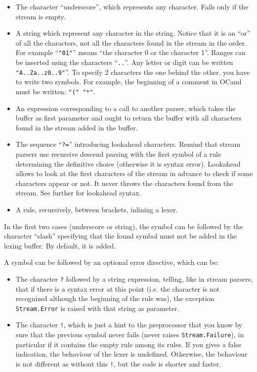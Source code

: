 \documentclass[11pt]{article}
\begin{document}
\begin{itemize}

\item The character ``underscore'', which represents any
  character. Fails only if the stream is empty.

\item A string which represent any character in the string. Notice
  that it is an ``or'' of all the characters, not all the characters
  found in the stream in the order. For example ``\verb/"01"/'' means
  ``the character 0 or the character 1''. Ranges can be inserted using
  the characters ``\verb/../''. Any letter or digit can be written
  \verb/"A..Za..z0..9"/''. To specify 2 characters the one behind the
  other, you have to write two symbols. For example, the beginning of
  a comment in OCaml must be written: \verb/"(" "*"/.

\item An expression corresponding to a call to another parser, which
  takes the buffer as first parameter and ought to return the buffer
  with all characters found in the stream added in the buffer.

\item The sequence ``\verb/?=/'' introducing lookahead characters.
  Remind that stream parsers use recursive descend parsing with the
  first symbol of a rule determining the definitive choice (otherwise
  it is syntax error). Lookahead allows to look at the first
  characters of the stream in advance to check if some characters
  appear or not. It never throws the characters found from the stream.
  See further for lookahead syntax.

\item A rule, recursively, between brackets, inlining a lexer.

\end{itemize}

In the first two cases (underscore or string), the symbol can be
followed by the character ``slash'' specifying that the found symbol
must not be added in the lexing buffer. By default, it is added.

A symbol can be followed by an optional error directive, which can be:

\begin{itemize}

\item The character \verb/?/ followed by a string expression, telling,
  like in stream parsers, that if there is a syntax error at this
  point (i.e. the character is not recognized although the beginning
  of the rule was), the exception \verb/Stream.Error/ is raised with
  that string as parameter.

\item The character \verb/!/, which is just a hint to the preprocessor
  that you know by sure that the previous symbol never fails (never
  raises \verb/Stream.Failure/), in particular if it contains the empty
  rule among its rules. If you gives a false indication, the behaviour
  of the lexer is undefined. Otherwise, the behaviour is not different
  as without this \verb/!/, but the code is shorter and faster.

\end{itemize}
\end{document}
